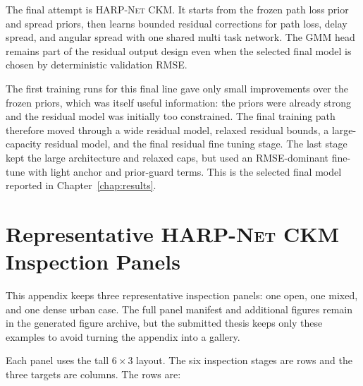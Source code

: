 The final attempt is \textsc{HARP-Net CKM}. It starts from
the frozen path loss prior and spread priors, then learns
bounded residual corrections for path loss, delay spread, and angular spread
with one shared multi task network. The GMM head remains part of the residual
output design even when the selected final model is chosen by deterministic
validation RMSE.

The first training runs for this final line gave only small improvements over the frozen
priors, which was itself useful information: the priors were already strong
and the residual model was initially too constrained. The final training path
therefore moved through a wide residual model, relaxed residual bounds, a
large-capacity residual model, and the final residual fine tuning stage. The
last stage kept the large architecture and relaxed caps, but used an
RMSE-dominant fine-tune with light anchor and prior-guard terms. This is the
selected final model reported in Chapter~\ref{chap:results}.

\endgroup

\chapter{Representative \textsc{HARP-Net CKM} Inspection Panels}

This appendix keeps three representative inspection panels: one open, one
mixed, and one dense urban case. The full panel manifest and additional
figures remain in the generated figure archive, but the submitted thesis keeps
only these examples to avoid turning the appendix into a gallery.

Each panel uses the tall \(6\times 3\) layout. The six inspection stages are
rows and the three targets are columns. The rows are:

